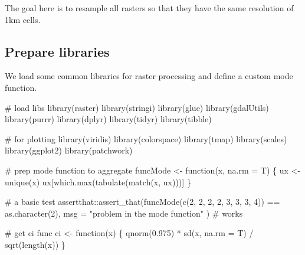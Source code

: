 \documentclass[
]{article}
\newenvironment{Shaded}{}{}
\newcommand{\CommentTok}[1]{\textcolor[rgb]{0.00,0.50,0.00}{#1}}
\newcommand{\ControlFlowTok}[1]{\textcolor[rgb]{0.00,0.00,1.00}{#1}}
\newcommand{\DataTypeTok}[1]{#1}
\newcommand{\DecValTok}[1]{#1}
\newcommand{\FloatTok}[1]{#1}
\newcommand{\KeywordTok}[1]{\textcolor[rgb]{0.00,0.00,1.00}{#1}}
\newcommand{\NormalTok}[1]{#1}
\newcommand{\OperatorTok}[1]{#1}
\newcommand{\StringTok}[1]{\textcolor[rgb]{0.00,0.50,0.50}{#1}}
\begin{document}
The goal here is to resample all rasters so that they have the same resolution of 1km cells.

\hypertarget{prepare-libraries-1}{%
\subsection{Prepare libraries}\label{prepare-libraries-1}}

We load some common libraries for raster processing and define a custom mode function.

\begin{Shaded}
\begin{Highlighting}[]
\CommentTok{# load libs}
\KeywordTok{library}\NormalTok{(raster)}
\KeywordTok{library}\NormalTok{(stringi)}
\KeywordTok{library}\NormalTok{(glue)}
\KeywordTok{library}\NormalTok{(gdalUtils)}
\KeywordTok{library}\NormalTok{(purrr)}
\KeywordTok{library}\NormalTok{(dplyr)}
\KeywordTok{library}\NormalTok{(tidyr)}
\KeywordTok{library}\NormalTok{(tibble)}

\CommentTok{# for plotting}
\KeywordTok{library}\NormalTok{(viridis)}
\KeywordTok{library}\NormalTok{(colorspace)}
\KeywordTok{library}\NormalTok{(tmap)}
\KeywordTok{library}\NormalTok{(scales)}
\KeywordTok{library}\NormalTok{(ggplot2)}
\KeywordTok{library}\NormalTok{(patchwork)}

\CommentTok{# prep mode function to aggregate}
\NormalTok{funcMode <-}\StringTok{ }\ControlFlowTok{function}\NormalTok{(x, }\DataTypeTok{na.rm =}\NormalTok{ T) \{}
\NormalTok{  ux <-}\StringTok{ }\KeywordTok{unique}\NormalTok{(x)}
\NormalTok{  ux[}\KeywordTok{which.max}\NormalTok{(}\KeywordTok{tabulate}\NormalTok{(}\KeywordTok{match}\NormalTok{(x, ux)))]}
\NormalTok{\}}

\CommentTok{# a basic test}
\NormalTok{assertthat}\OperatorTok{::}\KeywordTok{assert_that}\NormalTok{(}\KeywordTok{funcMode}\NormalTok{(}\KeywordTok{c}\NormalTok{(}\DecValTok{2}\NormalTok{, }\DecValTok{2}\NormalTok{, }\DecValTok{2}\NormalTok{, }\DecValTok{2}\NormalTok{, }\DecValTok{3}\NormalTok{, }\DecValTok{3}\NormalTok{, }\DecValTok{3}\NormalTok{, }\DecValTok{4}\NormalTok{)) }\OperatorTok{==}\StringTok{ }\KeywordTok{as.character}\NormalTok{(}\DecValTok{2}\NormalTok{),}
  \DataTypeTok{msg =} \StringTok{"problem in the mode function"}
\NormalTok{) }\CommentTok{# works}

\CommentTok{# get ci func}
\NormalTok{ci <-}\StringTok{ }\ControlFlowTok{function}\NormalTok{(x) \{}
  \KeywordTok{qnorm}\NormalTok{(}\FloatTok{0.975}\NormalTok{) }\OperatorTok{*}\StringTok{ }\KeywordTok{sd}\NormalTok{(x, }\DataTypeTok{na.rm =}\NormalTok{ T) }\OperatorTok{/}\StringTok{ }\KeywordTok{sqrt}\NormalTok{(}\KeywordTok{length}\NormalTok{(x))}
\NormalTok{\}}
\end{Highlighting}
\end{Shaded}
\end{document}
